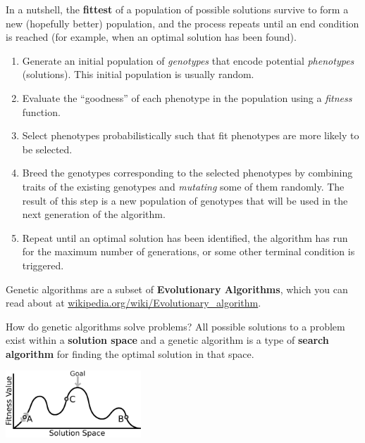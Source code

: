 \documentclass[10pt]{book}
\begin{document}
In a nutshell, the {\bf fittest} of a population of possible 
solutions survive to form a new (hopefully better) population, and the process
repeats until an end condition is reached (for example, when an optimal
solution has been found). 



\begin{enumerate}
  \item Generate an initial population of {\em genotypes} that encode potential
  {\em phenotypes} (solutions). This initial population is usually random. %

  \item Evaluate the ``goodness'' of each phenotype in the population using a 
  {\em fitness} function.

  \item Select phenotypes probabilistically such that fit phenotypes 
  are more likely to be selected.

  \item Breed the genotypes corresponding to the selected phenotypes by combining 
  traits of the existing genotypes and {\em mutating} some of them randomly. %
  The result of this step is a new population of genotypes that will be used in
  the next generation of the algorithm.

  \item Repeat until an optimal solution has been identified, the algorithm has run for the maximum 
  number of generations, or some other terminal condition is triggered.

\end{enumerate}

Genetic algorithms are a subset of {\bf Evolutionary Algorithms}, which you can
read about at \url{wikipedia.org/wiki/Evolutionary_algorithm}.

How do genetic algorithms solve problems? All possible solutions to a problem
exist within a {\bf solution space} and a genetic algorithm is a type of
{\bf search algorithm} for finding the optimal solution in that space.

\beforefig
\centerline{\includegraphics[width=2in]{./pycritters_figs/GeneticAlgStateSpace.eps}}
\afterfig
\end{document}
